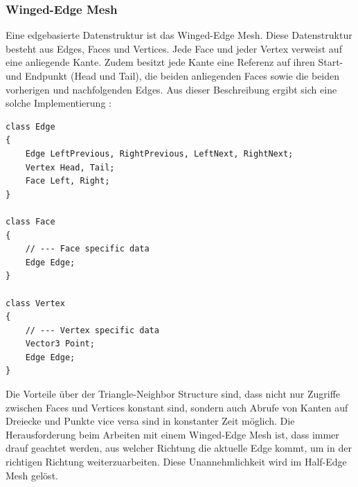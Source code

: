 \subsubsection{Winged-Edge Mesh}
Eine edgebasierte Datenstruktur ist das Winged-Edge Mesh. Diese Datenstruktur besteht aus Edges, Faces und Vertices. Jede Face und jeder Vertex verweist auf eine anliegende Kante. Zudem besitzt jede Kante eine Referenz auf ihren Start- und Endpunkt (Head und Tail), die beiden anliegenden Faces sowie die beiden vorherigen und nachfolgenden Edges. Aus dieser Beschreibung ergibt sich eine solche Implementierung \cite[S.273]{Shirley2010}:

\begin{lstlisting}
class Edge
{
	Edge LeftPrevious, RightPrevious, LeftNext, RightNext;
	Vertex Head, Tail;
	Face Left, Right;
}

class Face 
{
	// --- Face specific data
	Edge Edge;
}

class Vertex 
{
	// --- Vertex specific data
	Vector3 Point;
	Edge Edge;
}
\end{lstlisting}

Die Vorteile \"uber der Triangle-Neighbor Structure sind, dass nicht nur Zugriffe zwischen Faces und Vertices konstant sind, sondern auch Abrufe von Kanten auf Dreiecke und Punkte vice versa sind in konstanter Zeit m\"oglich. Die Herausforderung beim Arbeiten mit einem Winged-Edge Mesh ist, dass immer drauf geachtet werden, aus welcher Richtung die aktuelle Edge kommt, um in der richtigen Richtung weiterzuarbeiten. Diese Unannehmlichkeit wird im Half-Edge Mesh gel\"ost.